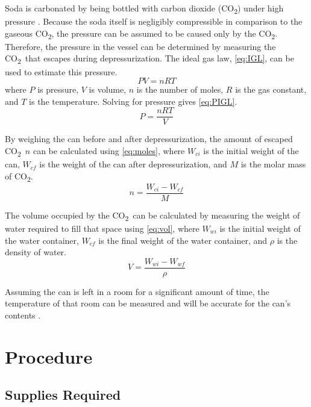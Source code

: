 \documentclass[10pt,journal,letterpaper]{IEEEtran}
\newcommand{\co}{CO\textsubscript{2}}
\begin{document}
Soda is carbonated by being bottled with carbon dioxide (\co) under high pressure \cite{b9}.
Because the soda itself is negligibly compressible in comparison to the gaseous \co , the pressure can be assumed to be caused only by the \co .
Therefore, the pressure in the vessel can be determined by measuring the \co\ that escapes during depressurization.
The ideal gas law, \eqref{eq:IGL}, can be used to estimate this pressure.
\begin{equation}
\label{eq:IGL}
PV=nRT
\end{equation}
where $P$ is pressure, $V$ is volume, $n$ is the number of moles, $R$ is the gas constant, and $T$ is the temperature.
Solving for pressure gives \eqref{eq:PIGL}.
\begin{equation}
\label{eq:PIGL}
P = \frac{nRT}{V}
\end{equation}

By weighing the can before and after depressurization, the amount of escaped \co\ $n$ can be calculated using \eqref{eq:moles}, where $W_{ci}$ is the initial weight of the can, $W_{cf}$ is the weight of the can after depressurization, and $M$ is the molar mass of \co.
\begin{equation}
\label{eq:moles}
n=\frac{W_{ci}-W_{cf}}{M}
\end{equation}

The volume occupied by the \co\ can be calculated by measuring the weight of water required to fill that space using \eqref{eq:vol}, where $W_{wi}$ is the initial weight of the water container, $W_{cf}$ is the final weight of the water container, and $\rho$ is the density of water.
\begin{equation}
\label{eq:vol}
V=\frac{W_{wi}-W_{wf}}{\rho}
\end{equation}

Assuming the can is left in a room for a significant amount of time, the temperature of that room can be measured and will be accurate for the can's contents \cite{b9}.

\section{Procedure}

\subsection{Supplies Required}
\end{document}
